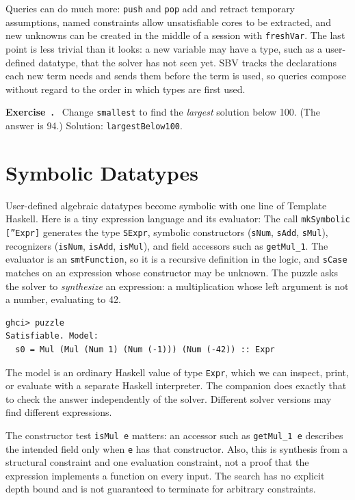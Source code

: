 \documentclass[acmsmall,screen,review,anonymous,nonacm]{acmart}
\newcommand{\code}[1]{\texttt{#1}}
\newcounter{exercise}
\newenvironment{exercise}{\refstepcounter{exercise}\par\medskip\noindent
  \textbf{Exercise~\theexercise.}\ }{\par\medskip}
\begin{document}
Queries can do much more: \code{push} and \code{pop} add and retract temporary
assumptions, named constraints allow unsatisfiable cores to be extracted, and new
unknowns can be created in the middle of a session with \code{freshVar}. The last
point is less trivial than it looks: a new variable may have a type, such as a
user-defined datatype, that the solver has not seen yet. SBV tracks the
declarations each new term needs and sends them before the term is used, so
queries compose without regard to the order in which types are first used.

\begin{exercise}
Change \code{smallest} to find the \emph{largest} solution below 100. (The answer
is 94.) Solution: \code{largestBelow100}.
\end{exercise}

\section{Symbolic Datatypes}
\label{sec:datatypes}

User-defined algebraic datatypes become symbolic with one line of Template
Haskell. Here is a tiny expression language and its evaluator:
The call \code{mkSymbolic [''Expr]} generates the type \code{SExpr}, symbolic
constructors (\code{sNum}, \code{sAdd}, \code{sMul}), recognizers (\code{isNum},
\code{isAdd}, \code{isMul}), and field accessors such as \code{getMul\_1}. The
evaluator is an \code{smtFunction}, so it is a recursive definition in the
logic, and \code{sCase} matches on an expression whose constructor may be
unknown. The puzzle asks the solver to \emph{synthesize} an expression: a
multiplication whose left argument is not a number, evaluating to 42.
\begin{lstlisting}[style=output]
ghci> puzzle
Satisfiable. Model:
  s0 = Mul (Mul (Num 1) (Num (-1))) (Num (-42)) :: Expr
\end{lstlisting}
The model is an ordinary Haskell value of type \code{Expr}, which we can inspect,
print, or evaluate with a separate Haskell interpreter. The companion does exactly
that to check the answer independently of the solver. Different solver versions
may find different expressions.

The constructor test \code{isMul e} matters: an accessor such as
\code{getMul\_1 e} describes the intended field only when \code{e} has that
constructor. Also, this is synthesis from a structural constraint and one
evaluation constraint, not a proof that the expression implements a function
on every input. The search has no explicit depth bound and is not guaranteed
to terminate for arbitrary constraints.
\end{document}
